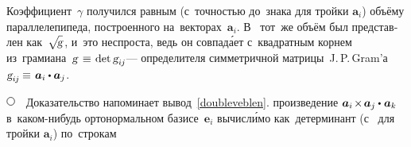 \begin{otherlanguage}{russian}
\vspace{-0.1em} \noindent
Коэффициент~$\gamma$ получился равным (с~точностью до~знака для  тройки ${\bm{a}_i}$) объёму параллелепипеда, построенного на~векторах~$\bm{a}_i$.
В~ тот~же объём был представлен как~\!${\sqrt{\hspace{-0.36ex}\mathstrut{\textsl{g}}}\hspace{.16ex}}$, и~это неспроста, ведь он совпад\'{а}ет с~квадратным корнем из~грамиана~\hbox{$\textsl{g} \hspace{.1ex} \hspace{.25ex} \equiv \hspace{.2ex} \operatorname{det} \textsl{g}_{i\hspace{-0.1ex}j}$\hspace{-0.12ex}}\:--- определителя симметричной матрицы~\hbox{J.\,P.\,Gram’а}~${\textsl{g}_{i\hspace{-0.1ex}j} \hspace{-0.1ex} \equiv \hspace{.2ex} \bm{a}_i \dotp \bm{a}_j}$.

\noindent
${ \tikz[baseline=-1ex] \draw [line width=.5pt, color=black, fill=white] (0, 0) circle (.8ex);
\hspace{.6em} }$
Доказательство напоминает вывод~\eqref{doubleveblen}.  произведение ${\bm{a}_i \hspace{-0.25ex} \times \hspace{-0.25ex} \bm{a}_j \dotp \hspace{.1ex} \bm{a}_k}$ в~каком\hbox{-}нибудь орто\-нормаль\-ном базисе~${\bm{e}_i}$ вычисл\'{и}мо как~детерминант (с~\inquotes{$-$} для  тройки ${\bm{a}_i}$) по~строкам


\end{otherlanguage}
